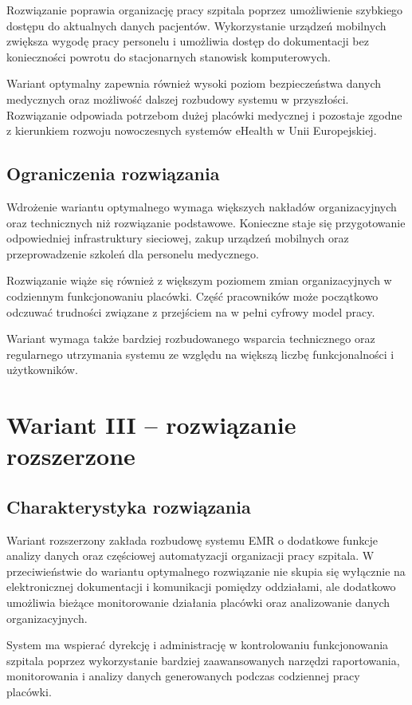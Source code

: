Rozwiązanie poprawia organizację pracy szpitala poprzez umożliwienie szybkiego dostępu do aktualnych danych pacjentów. Wykorzystanie urządzeń mobilnych zwiększa wygodę pracy personelu i umożliwia dostęp do dokumentacji bez konieczności powrotu do stacjonarnych stanowisk komputerowych.

Wariant optymalny zapewnia również wysoki poziom bezpieczeństwa danych medycznych oraz możliwość dalszej rozbudowy systemu w przyszłości. Rozwiązanie odpowiada potrzebom dużej placówki medycznej i pozostaje zgodne z kierunkiem rozwoju nowoczesnych systemów eHealth w Unii Europejskiej.

\subsection{Ograniczenia rozwiązania}
Wdrożenie wariantu optymalnego wymaga większych nakładów organizacyjnych oraz technicznych niż rozwiązanie podstawowe. Konieczne staje się przygotowanie odpowiedniej infrastruktury sieciowej, zakup urządzeń mobilnych oraz przeprowadzenie szkoleń dla personelu medycznego.

Rozwiązanie wiąże się również z większym poziomem zmian organizacyjnych w codziennym funkcjonowaniu placówki. Część pracowników może początkowo odczuwać trudności związane z przejściem na w pełni cyfrowy model pracy.

Wariant wymaga także bardziej rozbudowanego wsparcia technicznego oraz regularnego utrzymania systemu ze względu na większą liczbę funkcjonalności i użytkowników.

\section{Wariant III – rozwiązanie rozszerzone}

\subsection{Charakterystyka rozwiązania}
Wariant rozszerzony zakłada rozbudowę systemu EMR o dodatkowe funkcje analizy danych oraz częściowej automatyzacji organizacji pracy szpitala. W przeciwieństwie do wariantu optymalnego rozwiązanie nie skupia się wyłącznie na elektronicznej dokumentacji i komunikacji pomiędzy oddziałami, ale dodatkowo umożliwia bieżące monitorowanie działania placówki oraz analizowanie danych organizacyjnych.

System ma wspierać dyrekcję i administrację w kontrolowaniu funkcjonowania szpitala poprzez wykorzystanie bardziej zaawansowanych narzędzi raportowania, monitorowania i analizy danych generowanych podczas codziennej pracy placówki.
